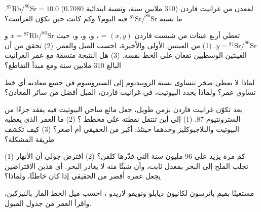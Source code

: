 \begin{exercise}[$\star\star$]\label{exo:g12:age-of-the-earth:6}
لمعدن من غرانيت فاردن (310 ملايين سنة، ونسبة ابتدائية 0.7080)
$^{87}\mathrm{Rb}/^{86}\mathrm{Sr} = 10.0$. ما نسبة
$^{87}\mathrm{Sr}/^{86}\mathrm{Sr}$ فيه اليوم؟ وكم كانت حين تكوّن
الغرانيت؟
\end{exercise}

\begin{exercise}[$\star\star$]\label{exo:g12:age-of-the-earth:7}
تعطي أربع عينات من شيست فاردن $(x, y)$ = ،
و، و، و، حيث $x =
{}^{87}\mathrm{Rb}/^{86}\mathrm{Sr}$ و$y = {}^{87}\mathrm{Sr}/^{86}\mathrm{Sr}$.
(1) من العينتين الأولى والأخيرة، احسب الميل والعمر.
(2) تحقق من أن العينتين الوسطيين تقعان على الخط نفسه. (3) هل
النتيجة متسقة مع عمر الغرانيت البالغ 310 ملايين سنة ومع مبدأ
التقاطع؟
\end{exercise}

\begin{exercise}[$\star\star$]\label{exo:g12:age-of-the-earth:8}
لماذا لا يعطي صخر تتساوى نسبة الروبيديوم إلى السترونتيوم في جميع معادنه
أي خط تساوي عمر؟ ولماذا يحدد البيوتيت، في غرانيت فاردن،
الميل أفضل من سائر المعادن؟
\end{exercise}

\begin{exercise}[$\star\star$]\label{exo:g12:age-of-the-earth:9}
بعد تكوّن غرانيت فاردن بزمن طويل، جعل مائع ساخن البيوتيت فيه يفقد جزءًا
من السترونتيوم-87. (1) إلى أين تنتقل نقطته على مخطط ؟
(2) ما العمر الذي يعطيه البيوتيت والبلاجيوكليز وحدهما حينئذ: أكبر من الحقيقي أم
أصغر؟ (3) كيف تكشف طريقة  المشكلة؟
\end{exercise}

\begin{exercise}[$\star\star$]\label{exo:g12:age-of-the-earth:10}
(1) كم مرة يزيد  على 96 مليون سنة التي قدّرها كلفن؟
(2) افترض جولي أن الأنهار تجلب الملح إلى البحر بمعدل
ثابت، وأن شيئًا منه لا يغادر البحر. أي هذين الافتراضين يجعل
عمره أقصر من الحقيقي إذا كان خاطئًا، ولماذا؟
\end{exercise}

\begin{exercise}[$\star\star$]\label{exo:g12:age-of-the-earth:11}
مستعينًا بقيم باترسون لكانيون ديابلو  ونويفو لاريدو
، احسب ميل الخط المار بالنيزكين،
واقرأ العمر من جدول الميول.
\end{exercise}

